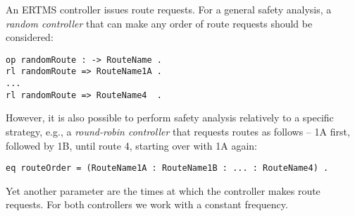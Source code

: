 An ERTMS controller issues route requests. For a general safety
analysis, a \emph{random controller} that can make any order of route
requests should be considered:
%
\begin{lstlisting}[columns=fixed]
op randomRoute : -> RouteName .
rl randomRoute => RouteName1A . 
... 
rl randomRoute => RouteName4  .
\end{lstlisting}
%
However, it is also possible to perform safety analysis relatively to
a specific strategy, e.g., a \emph{round-robin controller} that
requests routes as follows -- 1A first, followed by 1B, until route
4, starting over with 1A again:
\begin{lstlisting}[columns=fixed]
eq routeOrder = (RouteName1A : RouteName1B : ... : RouteName4) .
\end{lstlisting}
%
Yet another parameter are the times at which the controller makes
route requests. For both controllers we work with a constant
frequency.
